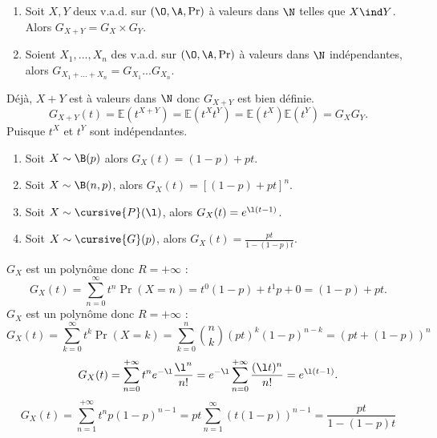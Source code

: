 \documentclass[11pt]{article}
\renewcommand*{\E}{\mathbb{E}}
\begin{document}
\begin{prop}{}{}
    \begin{enumerate}
        \item Soit $X,Y$ deux v.a.d. sur $(\O,\A,\Pr)$ à valeurs dans $\N$ telles que $X\ind Y$. Alors $G_{X+Y}=G_X\times G_Y$.
        \item Soient $X_1,...,X_n$ des v.a.d. sur $(\O,\A,\Pr)$ à valeurs dans $\N$ indépendantes, alors $G_{X_1+...+X_n}=G_{X_1}...G_{X_n}$.
    \end{enumerate}
    \tcblower
     Déjà, $X+Y$ est à valeurs dans $\N$ donc $G_{X+Y}$ est bien définie.
    \begin{equation*}
        G_{X+Y}(t) = \E(t^{X+Y}) = \E(t^Xt^Y) = \E(t^X)\E(t^Y)=G_XG_Y.
    \end{equation*}
    Puisque $t^X$ et $t^Y$ sont indépendantes.
\end{prop}

\pagebreak

\begin{prop}{}{}
    \begin{enumerate}
        \item Soit $X\sim \B(p)$ alors $G_X(t)=(1-p)+pt$.
        \item Soit $X\sim \B(n,p)$, alors $G_X(t)=\left[ (1-p) + pt \right]^n$.
        \item Soit $X\sim\cursive{P}(\l)$, alors $G_X(t)=e^{\l(t-1)}$.
        \item Soit $X\sim\cursive{G}(p)$, alors $G_X(t)=\frac{pt}{1-(1-p)t}$.
    \end{enumerate}
    \tcblower
     $G_X$ est un polynôme donc $R=+\infty$ :
    \begin{equation*}
        G_X(t) = \sum_{n=0}^\infty t^n\Pr(X=n) = t^0(1-p) + t^1p + 0 = (1-p)+pt.
    \end{equation*}
     $G_X$ est un polynôme donc $R=+\infty$ :
    \begin{equation*}
        G_X(t) = \sum_{k=0}^\infty t^k\Pr(X=k) = \sum_{k=0}^n \binom{n}{k}(pt)^k(1-p)^{n-k} = (pt + (1-p))^n
    \end{equation*}
    \begin{equation*}
        G_X(t) = \sum_{n=0}^{+\infty}t^ne^{-\l}\frac{\l^n}{n!} = e^{-\l}\sum_{n=0}^{+\infty}\frac{(\l t)^n}{n!} = e^{\l(t-1)}.
    \end{equation*}
    \begin{equation*}
        G_X(t) = \sum_{n=1}^{+\infty} t^n p(1-p)^{n-1} = pt\sum_{n=1}^{\infty}(t(1-p))^{n-1} = \frac{pt}{1-(1-p)t}
    \end{equation*}
\end{prop}
\end{document}
